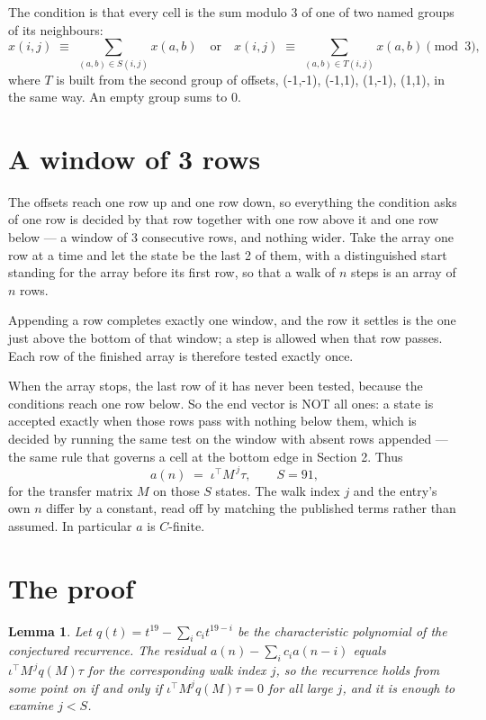 \documentclass[11pt,a4paper]{article}
\theoremstyle{plain}
\newtheorem{lemma}[theorem]{Lemma}
\theoremstyle{definition}
\begin{document}
The condition is that every cell is the sum modulo $3$ of one of two named groups of its neighbours:
\[
x(i,j)\;\equiv\;\sum_{(a,b)\in S(i,j)}x(a,b) \quad\text{or}\quad x(i,j)\;\equiv\;\sum_{(a,b)\in T(i,j)}x(a,b) \pmod{3},
\]
where $T$ is built from the second group of offsets, (-1,-1), (-1,1), (1,-1), (1,1), in the same way. An empty group sums to $0$.

\section{A window of 3 rows}

The offsets reach one row up and one row down, so everything the condition asks of one row is
decided by that row together with one row above it and one row below --- a window of
$3$ consecutive rows, and nothing wider. Take the array one row at a time
and let the state be the last 2 of them, with a distinguished start standing for the
array before its first row, so that a walk of $n$ steps is an array of $n$ rows.

Appending a row completes exactly one window, and the row it settles is the one just above the bottom of that window; a step is
allowed when that row passes. Each row of the finished
array is therefore tested exactly once.

When the array stops, the last row of it has never been tested, because the
conditions reach one row below. So the end vector is NOT all ones: a state is accepted exactly when
those rows pass with nothing below them, which is decided by running the same test on the window
with absent rows appended --- the same rule that governs a cell at the bottom edge in
Section 2.
Thus
\[
a(n)\;=\;\iota^{\!\top}M^{\,j}\tau ,\qquad S=91,
\]
for the transfer matrix $M$ on those $S$ states. The walk index $j$ and the entry's own $n$
differ by a constant, read off by matching the published terms rather than assumed. In
particular $a$ is $C$-finite.

\section{The proof}

\begin{lemma}\label{lem:crit}
Let $q(t)=t^{19}-\sum_i c_it^{19-i}$ be the characteristic polynomial of the
conjectured recurrence. The residual $a(n)-\sum_ic_ia(n-i)$ equals
$\iota^{\!\top}M^{\,j}q(M)\tau$ for the corresponding walk index $j$, so the recurrence
holds from some point on if and only if $\iota^{\!\top}M^{j}q(M)\tau=0$ for all large $j$,
and it is enough to examine $j<S$.
\end{lemma}
\end{document}
